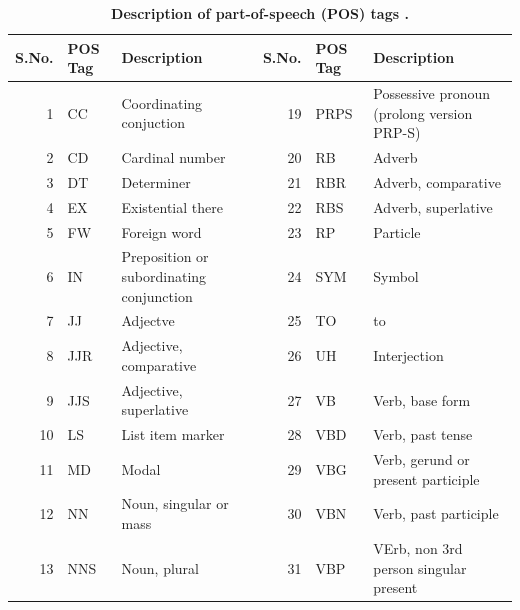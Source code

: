 \documentclass{ieeeaccess}
\begin{document}
\begin{table}[!h]
\centering
\caption{\textbf{Description of part-of-speech (POS) tags \cite{b30}.}}
\label{tab:t1}
\begin{tabular}{|r|l|l|r|l|l|} 
\hline
S.No. & POS Tag & Description                              & S.No. & POS Tag & Description                                   \\ 
\hline
1     & CC      & Coordinating conjuction                  & 19    & PRPS    & Possessive pronoun (prolong version PRP-S)~   \\ 
\hline
2     & CD      & Cardinal number                          & 20    & RB      & Adverb                                        \\ 
\hline
3     & DT      & Determiner                               & 21    & RBR     & Adverb, comparative                           \\ 
\hline
4     & EX      & Existential there                        & 22    & RBS     & Adverb, superlative                           \\ 
\hline
5     & FW      & Foreign word                             & 23    & RP      & Particle                                      \\ 
\hline
6     & IN      & Preposition or subordinating conjunction & 24    & SYM     & Symbol                                        \\ 
\hline
7     & JJ      & Adjectve                                 & 25    & TO      & to                                            \\ 
\hline
8     & JJR     & Adjective, comparative                   & 26    & UH      & Interjection                                  \\ 
\hline
9     & JJS     & Adjective, superlative                   & 27    & VB      & Verb, base form                               \\ 
\hline
10    & LS      & List item marker                         & 28    & VBD     & Verb, past tense                              \\ 
\hline
11    & MD      & Modal                                    & 29    & VBG     & Verb, gerund or present participle            \\ 
\hline
12    & NN      & Noun, singular or mass                   & 30    & VBN     & Verb, past participle                         \\ 
\hline
13    & NNS     & Noun, plural                             & 31    & VBP     & VErb, non 3rd person singular present         \\ 

\end{tabular}
\end{table}
\end{document}

